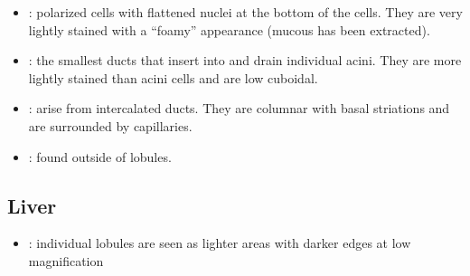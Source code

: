 \begin{itemize}
\begin{multicols}{2}
\begin{itemize}
    \begin{center}
    \end{center}
    
    \item {}: polarized cells with flattened nuclei at the bottom of the cells. They are very lightly stained with a ``foamy'' appearance (mucous has been extracted).
    
    \begin{center}
    \end{center}
    
    \item {}: the smallest ducts that insert into and drain individual acini. They are more lightly stained than acini cells and are low cuboidal.
    
    \begin{center}
    \end{center}
    
    \item {}: arise from intercalated ducts. They are columnar with basal striations and are surrounded by capillaries.
    
    \begin{center}
    \end{center}
    
    \item {}: found outside of lobules. 
    
    \bigskip

    \begin{center}
    \end{center}
    
  \end{itemize}
  \end{multicols}
  
  \subsection{Liver}\label{Liver}
  \begin{center}
  \end{center}
  \begin{multicols}{2}
  \begin{itemize}
    \item {}: individual lobules are seen as lighter areas with darker edges at low magnification
    

\end{itemize}
\end{multicols}
\end{itemize}
